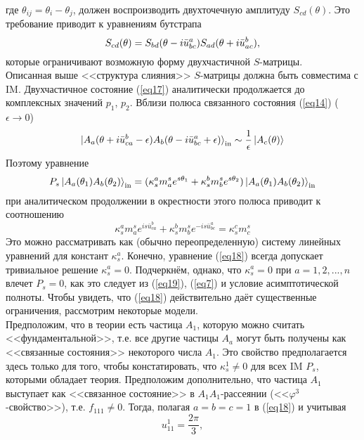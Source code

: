 \documentclass[12pt]{article}
\theoremstyle{definition}
\begin{document}
где $\theta_{ij}=\theta_i-\theta_j$, должен воспроизводить двухточечную амплитуду $S_{cd}(\theta)$. Это требование приводит к уравнениям бутстрапа
\begin{equation}\label{eq23}
    S_{cd}(\theta)=S_{bd}(\theta-i\bar{u}^a_{bc})S_{ad}(\theta+i\Bar{u}^b_{ac}),
\end{equation}
которые ограничивают возможную форму двухчастичной $S$-матрицы.\\
Описанная выше <<структура слияния>> $S$-матрицы должна быть совместима с IM. Двухчастичное состояние (\ref{eq17}) аналитически продолжается до комплексных значений $p_1$, $p_2$. Вблизи полюса связанного состояния (\ref{eq14}) ($\epsilon\rightarrow0$)
\begin{equation}
    \ket{A_a(\theta+i\bar{u}^b_{ca}-\epsilon)A_b(\theta-i\bar{u}^a_{bc}+\epsilon)}_\text{in}\sim\frac{1}{\epsilon}\ket{A_c(\theta)}
\end{equation}
Поэтому уравнение
\begin{equation}
    P_s\ket{A_a(\theta_1)A_b(\theta_2)}_\text{in}=(\kappa^a_sm^s_ae^{s\theta_1}+\kappa_s^bm^s_be^{s\theta_2})\ket{A_a(\theta_1)A_b(\theta_2)}_\text{in}
\end{equation}
при аналитическом продолжении в окрестности этого полюса приводит к соотношению
\begin{equation}\label{eq18}
    \kappa^a_sm^s_ae^{is\bar{u}^b_{ca}}+\kappa_s^bm_b^se^{-is\bar{u}_{bc}^a}=\kappa_s^cm_c^s
\end{equation}
Это можно рассматривать как (обычно переопределенную) систему линейных уравнений для констант $\kappa_s^a$. Конечно, уравнение (\ref{eq18}) всегда допускает тривиальное решение $\kappa^a_s=0$. Подчеркнём, однако, что $\kappa_s^a = 0$ при $a=1,2,...,n$ влечет $P_s = 0$, как это следует из (\ref{eq19}), (\ref{eq7}) и условие асимптотической полноты. Чтобы увидеть, что (\ref{eq18}) действительно даёт существенные ограничения, рассмотрим некоторые модели.\\
Предположим, что в теории есть частица $A_1$, которую можно считать <<фундаментальной>>, т.е. все другие частицы $A_a$ могут быть получены как <<связанные состояния>> некоторого числа $A_1$. Это свойство предполагается здесь только для того, чтобы констатировать, что $\kappa_s^1\neq0$ для всех IM $P_s$, которыми обладает теория. Предположим дополнительно, что частица $A_1$ выступает как <<связанное состояние>> в $A_1A_1$-рассеянии (<<$\varphi^3$-свойство>>), т.е. $f_{111}\neq0$. Тогда, полагая $a = b = c = 1$ в (\ref{eq18}) и учитывая
\begin{equation}
    u_{11}^1=\frac{2\pi}{3},
\end{equation}
\end{document}
